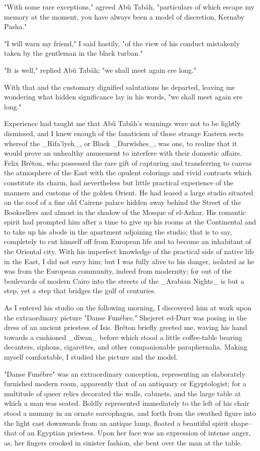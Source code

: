 "With some rare exceptions," agreed Abû Tabâh, "particulars of which
escape my memory at the moment, you have always been a model of
discretion, Kernaby Pasha."

"I will warn my friend," I said hastily, "of the view of his conduct
mistakenly taken by the gentleman in the black turban."

"It is well," replied Abû Tabâh; "we shall meet again ere long."

With that and the customary dignified salutations he departed, leaving
me wondering what hidden significance lay in his words, "we shall meet
again ere long."

Experience had taught me that Abû Tabâh's warnings were not to be
lightly dismissed, and I knew enough of the fanaticism of those
strange Eastern sects whereof the _Rifa'îyeh_, or Black _Darwîshes_,
was one, to realize that it would prove an unhealthy amusement to
interfere with their domestic affairs. Felix Bréton, who possessed the
rare gift of capturing and transferring to canvas the atmosphere of
the East with the opulent colorings and vivid contrasts which
constitute its charm, had nevertheless but little practical experience
of the manners and customs of the golden Orient. He had leased a large
studio situated on the roof of a fine old Cairene palace hidden away
behind the Street of the Booksellers and almost in the shadow of the
Mosque of el-Azhar. His romantic spirit had prompted him after a time
to give up his rooms at the Continental and to take up his abode in
the apartment adjoining the studio; that is to say, completely to cut
himself off from European life and to become an inhabitant of the
Oriental city. With his imperfect knowledge of the practical side of
native life in the East, I did not envy him; but I was fully alive to
his danger, isolated as he was from the European community, indeed
from modernity; for out of the boulevards of modern Cairo into the
streets of the _Arabian Nights_ is but a step, yet a step that bridges
the gulf of centuries.

As I entered his studio on the following morning, I discovered him at
work upon the extraordinary picture "Danse Funébre." Shejeret ed-Durr
was posing in the dress of an ancient priestess of Isis. Bréton
briefly greeted me, waving his hand towards a cushioned _dîwan_ before
which stood a little coffee-table bearing decanters, siphons,
cigarettes, and other companionable paraphernalia. Making myself
comfortable, I studied the picture and the model.

"Danse Funébre" was an extraordinary conception, representing an
elaborately furnished modern room, apparently that of an antiquary
or Egyptologist; for a multitude of queer relics decorated the walls,
cabinets, and the large table at which a man was seated. Boldly
represented immediately to the left of his chair stood a mummy in an
ornate sarcophagus, and forth from the swathed figure into the light
cast downwards from an antique lamp, floated a beautiful spirit
shape--that of an Egyptian priestess. Upon her face was an expression
of intense anger, as, her fingers crooked in sinister fashion, she
bent over the man at the table.

